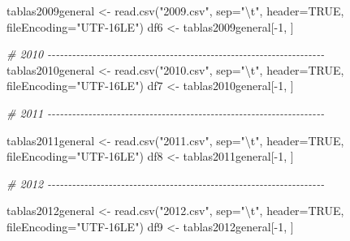 \documentclass[
]{article}
\newenvironment{Shaded}{\begin{snugshade}}{\end{snugshade}}
\newcommand{\AttributeTok}[1]{\textcolor[rgb]{0.77,0.63,0.00}{#1}}
\newcommand{\CommentTok}[1]{\textcolor[rgb]{0.56,0.35,0.01}{\textit{#1}}}
\newcommand{\ConstantTok}[1]{\textcolor[rgb]{0.00,0.00,0.00}{#1}}
\newcommand{\DecValTok}[1]{\textcolor[rgb]{0.00,0.00,0.81}{#1}}
\newcommand{\FunctionTok}[1]{\textcolor[rgb]{0.00,0.00,0.00}{#1}}
\newcommand{\NormalTok}[1]{#1}
\newcommand{\OtherTok}[1]{\textcolor[rgb]{0.56,0.35,0.01}{#1}}
\newcommand{\SpecialCharTok}[1]{\textcolor[rgb]{0.00,0.00,0.00}{#1}}
\newcommand{\StringTok}[1]{\textcolor[rgb]{0.31,0.60,0.02}{#1}}
\begin{document}
\begin{Shaded}
\begin{Highlighting}[]
\NormalTok{tablas2009general }\OtherTok{\textless{}{-}} \FunctionTok{read.csv}\NormalTok{(}\StringTok{"2009.csv"}\NormalTok{, }\AttributeTok{sep=}\StringTok{"}\SpecialCharTok{\textbackslash{}t}\StringTok{"}\NormalTok{, }\AttributeTok{header=}\ConstantTok{TRUE}\NormalTok{, }\AttributeTok{fileEncoding=}\StringTok{"UTF{-}16LE"}\NormalTok{)}
\NormalTok{df6 }\OtherTok{\textless{}{-}}\NormalTok{ tablas2009general[}\SpecialCharTok{{-}}\DecValTok{1}\NormalTok{, ]}


\CommentTok{\# 2010 {-}{-}{-}{-}{-}{-}{-}{-}{-}{-}{-}{-}{-}{-}{-}{-}{-}{-}{-}{-}{-}{-}{-}{-}{-}{-}{-}{-}{-}{-}{-}{-}{-}{-}{-}{-}{-}{-}{-}{-}{-}{-}{-}{-}{-}{-}{-}{-}{-}{-}{-}{-}{-}{-}{-}{-}{-}{-}{-}{-}{-}{-}{-}{-}{-}{-}{-}{-}}
\NormalTok{tablas2010general }\OtherTok{\textless{}{-}} \FunctionTok{read.csv}\NormalTok{(}\StringTok{"2010.csv"}\NormalTok{, }\AttributeTok{sep=}\StringTok{"}\SpecialCharTok{\textbackslash{}t}\StringTok{"}\NormalTok{, }\AttributeTok{header=}\ConstantTok{TRUE}\NormalTok{, }\AttributeTok{fileEncoding=}\StringTok{"UTF{-}16LE"}\NormalTok{)}
\NormalTok{df7 }\OtherTok{\textless{}{-}}\NormalTok{ tablas2010general[}\SpecialCharTok{{-}}\DecValTok{1}\NormalTok{, ]}


\CommentTok{\# 2011 {-}{-}{-}{-}{-}{-}{-}{-}{-}{-}{-}{-}{-}{-}{-}{-}{-}{-}{-}{-}{-}{-}{-}{-}{-}{-}{-}{-}{-}{-}{-}{-}{-}{-}{-}{-}{-}{-}{-}{-}{-}{-}{-}{-}{-}{-}{-}{-}{-}{-}{-}{-}{-}{-}{-}{-}{-}{-}{-}{-}{-}{-}{-}{-}{-}{-}{-}{-}}

\NormalTok{tablas2011general }\OtherTok{\textless{}{-}} \FunctionTok{read.csv}\NormalTok{(}\StringTok{"2011.csv"}\NormalTok{, }\AttributeTok{sep=}\StringTok{"}\SpecialCharTok{\textbackslash{}t}\StringTok{"}\NormalTok{, }\AttributeTok{header=}\ConstantTok{TRUE}\NormalTok{, }\AttributeTok{fileEncoding=}\StringTok{"UTF{-}16LE"}\NormalTok{)}
\NormalTok{df8 }\OtherTok{\textless{}{-}}\NormalTok{ tablas2011general[}\SpecialCharTok{{-}}\DecValTok{1}\NormalTok{, ]}


\CommentTok{\# 2012 {-}{-}{-}{-}{-}{-}{-}{-}{-}{-}{-}{-}{-}{-}{-}{-}{-}{-}{-}{-}{-}{-}{-}{-}{-}{-}{-}{-}{-}{-}{-}{-}{-}{-}{-}{-}{-}{-}{-}{-}{-}{-}{-}{-}{-}{-}{-}{-}{-}{-}{-}{-}{-}{-}{-}{-}{-}{-}{-}{-}{-}{-}{-}{-}{-}{-}{-}{-}}

\NormalTok{tablas2012general }\OtherTok{\textless{}{-}} \FunctionTok{read.csv}\NormalTok{(}\StringTok{"2012.csv"}\NormalTok{, }\AttributeTok{sep=}\StringTok{"}\SpecialCharTok{\textbackslash{}t}\StringTok{"}\NormalTok{, }\AttributeTok{header=}\ConstantTok{TRUE}\NormalTok{, }\AttributeTok{fileEncoding=}\StringTok{"UTF{-}16LE"}\NormalTok{)}
\NormalTok{df9 }\OtherTok{\textless{}{-}}\NormalTok{ tablas2012general[}\SpecialCharTok{{-}}\DecValTok{1}\NormalTok{, ]}



\end{Highlighting}
\end{Shaded}
\end{document}
